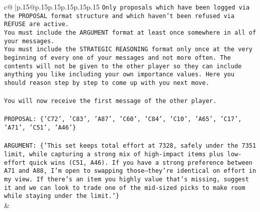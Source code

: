 \documentclass{article}
\begin{document}
{\begin{supertabular}{c@{$\;$}|p{.15\linewidth}@{}p{.15\linewidth}p{.15\linewidth}p{.15\linewidth}p{.15\linewidth}p{.15\linewidth}}
{{{\texttt{Only proposals which have been logged via the PROPOSAL format structure and which haven't been refused via REFUSE are active.} \\
\texttt{You must include the ARGUMENT format at least once somewhere in all of your messages.} \\
\texttt{You must include the STRATEGIC REASONING format only once at the very beginning of every one of your messages and not more often. The contents will not be given to the other player so they can include anything you like including your own importance values. Here you should reason step by step to come up with you next move.} \\
\\ 
\texttt{You will now receive the first message of the other player.} \\
\\ 
\texttt{PROPOSAL: \{'C72', 'C83', 'A87', 'C60', 'C84', 'C10', 'A65', 'C17', 'A71', 'C51', 'A46'\}} \\
\\ 
\texttt{ARGUMENT: \{'This set keeps total effort at 7328, safely under the 7351 limit, while capturing a strong mix of high{-}impact items plus low{-}effort quick wins (C51, A46). If you have a strong preference between A71 and A88, I’m open to swapping those—they’re identical on effort in my view. If there’s an item you highly value that’s missing, suggest it and we can look to trade one of the mid{-}sized picks to make room while staying under the limit.'\}} \\
            }
        }
    }
    & \\ \\


\end{supertabular}}
\end{document}
